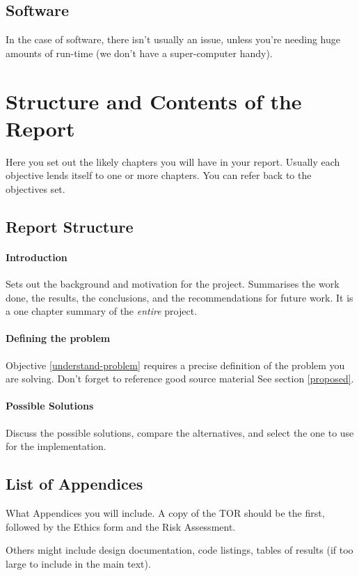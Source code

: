 \subsection{Software}
In the case of software, there isn't usually an issue, unless you're needing huge amounts of run-time (we don't have a super-computer handy).

\section{Structure and Contents of the Report}
Here you set out the likely chapters you will have in your report.  Usually each objective lends itself to one or more chapters.  You can refer back to the objectives set.
\subsection{Report Structure}

\paragraph{Introduction}  Sets out the background and motivation for the project.  Summarises the work done, the results, the conclusions, and the recommendations for future work.  It is a one chapter summary of the \emph{entire} project.

\paragraph{Defining the problem}  Objective \ref{understand-problem} requires a precise definition of the problem you are solving.  Don't forget to reference good source material  See section \ref{proposed}.

\paragraph{Possible Solutions} Discuss the possible solutions, compare the
alternatives, and select the one to use for the  implementation.

\subsection{List of Appendices}
What Appendices you will include.  A copy of the TOR should be the first, followed by the Ethics form and the Risk Assessment.

Others might include design documentation, code listings, tables of results (if too large to include in the main text).

